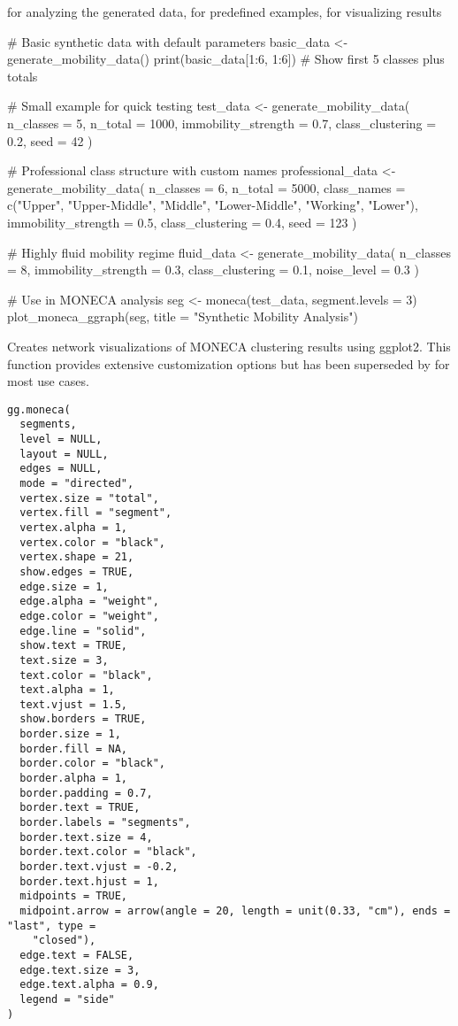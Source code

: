 \documentclass[a4paper]{book}
\begin{document}
%
\begin{SeeAlso}
 for analyzing the generated data,
 for predefined examples,
 for visualizing results
\end{SeeAlso}
%
\begin{Examples}
\begin{ExampleCode}
# Basic synthetic data with default parameters
basic_data <- generate_mobility_data()
print(basic_data[1:6, 1:6])  # Show first 5 classes plus totals

# Small example for quick testing
test_data <- generate_mobility_data(
  n_classes = 5,
  n_total = 1000,
  immobility_strength = 0.7,
  class_clustering = 0.2,
  seed = 42
)

# Professional class structure with custom names
professional_data <- generate_mobility_data(
  n_classes = 6,
  n_total = 5000,
  class_names = c("Upper", "Upper-Middle", "Middle", 
                  "Lower-Middle", "Working", "Lower"),
  immobility_strength = 0.5,
  class_clustering = 0.4,
  seed = 123
)

# Highly fluid mobility regime
fluid_data <- generate_mobility_data(
  n_classes = 8,
  immobility_strength = 0.3,
  class_clustering = 0.1,
  noise_level = 0.3
)

# Use in MONECA analysis
seg <- moneca(test_data, segment.levels = 3)
plot_moneca_ggraph(seg, title = "Synthetic Mobility Analysis")

\end{ExampleCode}
\end{Examples}
%
\begin{Description}
Creates network visualizations of MONECA clustering results using ggplot2.
This function provides extensive customization options but has been superseded
by  for most use cases.
\end{Description}
%
\begin{Usage}
\begin{verbatim}
gg.moneca(
  segments,
  level = NULL,
  layout = NULL,
  edges = NULL,
  mode = "directed",
  vertex.size = "total",
  vertex.fill = "segment",
  vertex.alpha = 1,
  vertex.color = "black",
  vertex.shape = 21,
  show.edges = TRUE,
  edge.size = 1,
  edge.alpha = "weight",
  edge.color = "weight",
  edge.line = "solid",
  show.text = TRUE,
  text.size = 3,
  text.color = "black",
  text.alpha = 1,
  text.vjust = 1.5,
  show.borders = TRUE,
  border.size = 1,
  border.fill = NA,
  border.color = "black",
  border.alpha = 1,
  border.padding = 0.7,
  border.text = TRUE,
  border.labels = "segments",
  border.text.size = 4,
  border.text.color = "black",
  border.text.vjust = -0.2,
  border.text.hjust = 1,
  midpoints = TRUE,
  midpoint.arrow = arrow(angle = 20, length = unit(0.33, "cm"), ends = "last", type =
    "closed"),
  edge.text = FALSE,
  edge.text.size = 3,
  edge.text.alpha = 0.9,
  legend = "side"
)
\end{verbatim}
\end{Usage}
\end{document}
